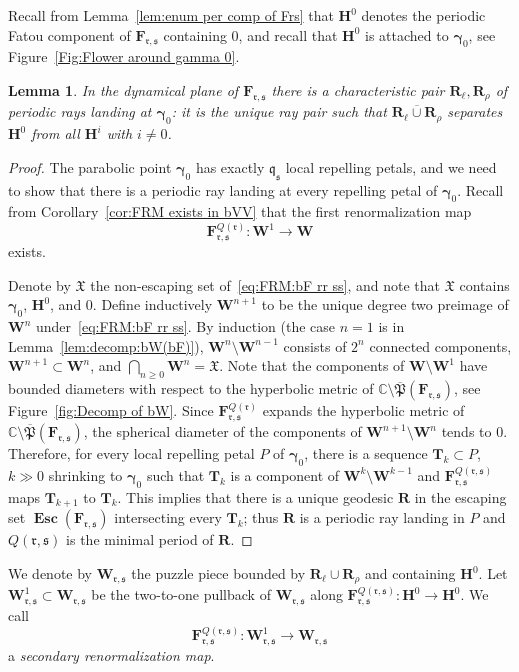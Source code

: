 \documentclass{amsart}
\newcommand{\1}{{\mathbb 1 }}
\newcommand\Post{{\mathfrak P}}
\newcommand\frakX{{\mathfrak X}}
\newcommand{\bF}{{\mathbf F}}
\newcommand{\bW}{{\mathbf W}}
\newcommand{\bR}{{\mathbf R}}
\newcommand{\bT}{{\mathbf T}}
\newcommand{\bH}{{\mathbf H}}
\renewcommand{\qq}{\mathfrak{q}}
\newcommand{\rr}{\mathfrak{r}}
\renewcommand{\ss}{\mathfrak{s}}
\newcommand{\C}{\mathbb{C}}
\newtheorem{lem}[thm]{Lemma}
\theoremstyle{remark}
\numberwithin{equation}{section}
\theoremstyle{definition}
\newcommand{\Esc}{{\boldsymbol{\operatorname{Esc}}}}
\newcommand{\bgamma}{{\boldsymbol{ \gamma}}}
\theoremstyle{nonumberbreak}
\begin{document}
Recall from Lemma~\ref{lem:enum per comp of Frs} that $\bH^0$ denotes the periodic Fatou component of $\bF_{\rr,\ss}$ containing $0$, and recall that $\bH^0$ is attached to $\bgamma_0$, see Figure~\ref{Fig:Flower around gamma 0}. 
\begin{lem}
In the dynamical plane of $\bF_{\rr,\ss}$ there is a characteristic pair $\bR_\ell,\bR_\rho$ of periodic rays landing at $\bgamma_0$: it is the unique ray pair such that $\overline {\bR_\ell\cup \bR_{\rho}}$ separates $\bH^0$ from all $\bH^i$ with $i\not=0$.
\end{lem}
\begin{proof}
The parabolic point $\bgamma_0$ has exactly $\qq_\ss$ local repelling petals, and we need to show that there is a periodic ray landing at every repelling petal of $\bgamma_0$. Recall from Corollary~\ref{cor:FRM exists in bVV} that the first renormalization map
 \begin{equation}
 \label{eq:FRM:bF rr ss}
\bF_{\rr,\ss}^{Q(\rr)}\colon \bW^1\to \bW
\end{equation}
exists.

Denote by $\frakX$ the non-escaping set of~\eqref{eq:FRM:bF rr ss}, and note that $\frakX$ contains $\bgamma_0$, $\bH^0$, and $0$. Define inductively $\bW^{n+1}$ to be the unique degree two preimage of $\bW^n$ under~\eqref{eq:FRM:bF rr ss}. By induction (the case $n=1$ is in Lemma~\ref{lem:decomp:bW(bF)}), $\bW^{n}\setminus \bW^{n-1}$ consists of $2^n$ connected components, $\bW^{n+1}\subset \bW^n$, and $\displaystyle{\bigcap_{n\ge0} \bW^n=\frakX}$. Note that the components of $\bW\setminus \bW^1$ have bounded diameters with respect to the hyperbolic metric of $\C\setminus \overline \Post(\bF_{\rr,\ss})$, see Figure~\ref{fig:Decomp of bW}. Since $\bF^{Q(\rr)}_{\rr,\ss}$ expands the hyperbolic metric of $\C\setminus \overline \Post(\bF_{\rr,\ss})$, the spherical diameter of the components of $\bW^{n+1}\setminus \bW^n$ tends to $0$. Therefore, for every local repelling petal $P$ of $\bgamma_0$, there is a sequence $\bT_k\subset P$, $k\gg0$ shrinking to $\bgamma_0$ such that $\bT_k$ is a component of $\bW^{k}\setminus \bW^{k-1}$ and $\bF_{\rr,\ss}^{Q(\rr,\ss)}$ maps $\bT_{k+1}$ to $\bT_k$. This implies that there is a unique geodesic $\bR$ in the escaping set $\Esc (\bF_{\rr,\ss})$ intersecting every $\bT_k$; thus $\bR$ is a periodic ray landing in $P$ and $Q(\rr,\ss)$ is the minimal period of $\bR$.
\end{proof}

 We denote by $\bW_{\rr,\ss}$ the puzzle piece bounded by $\bR_\ell\cup \bR_{\rho}$ and containing $\bH^0$. Let  $\bW^1_{\rr,\ss}\subset \bW_{\rr,\ss} $ be the two-to-one pullback of $ \bW_{\rr,\ss}$ along $\bF^{Q(\rr,\ss)}_{\rr,\ss}\colon \bH^0\to \bH^0$. We call 
\begin{equation}
\label{eq:SRM:rr ss}
\bF^{Q(\rr,\ss)}_{\rr,\ss}\colon \bW_{\rr,\ss}^1 \to \bW_{\rr,\ss}
\end{equation}
a \emph{secondary renormalization map}. 
\end{document}
